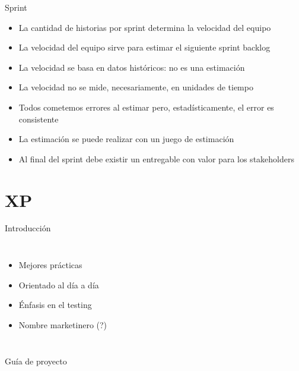 \documentclass{beamer}
\begin{document}
\begin{frame}{Sprint}
\begin{itemize}
        \item La cantidad de historias por sprint determina la velocidad del equipo
        \item La velocidad del equipo sirve para estimar el siguiente sprint backlog
        \item La velocidad se basa en datos hist\'oricos: no es una estimaci\'on
        \item La velocidad no se mide, necesariamente, en unidades de tiempo
        \item Todos cometemos errores al estimar pero, estad\'isticamente, el error es consistente
        \item La estimaci\'on se puede realizar con un juego de estimaci\'on
        \item Al final del sprint debe existir un entregable con valor para los stakeholders
\end{itemize}
\end{frame}



\section{XP}

\begin{frame}{Introducci\'on}
\begin{columns}
  \begin{itemize}
    \item Mejores pr\'acticas
    \item Orientado al d\'ia a d\'ia
    \item \'Enfasis en el testing
    \item Nombre marketinero (?)
  \end{itemize}
  \begin{center}\end{center}
\end{columns}
\end{frame}

\begin{frame}{Gu\'ia de proyecto}
\begin{center}
\end{center}
\end{frame}
\end{document}
